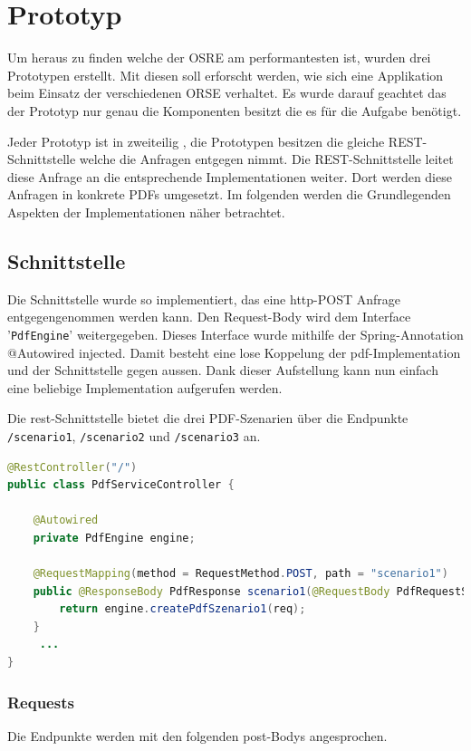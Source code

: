 \documentclass[main.tex]{subfiles}
\begin{document}
\chapter{Prototyp}
Um heraus zu finden welche der OSRE am performantesten ist, wurden drei Prototypen erstellt. Mit diesen soll erforscht werden, wie sich eine Applikation beim Einsatz der verschiedenen ORSE verhaltet. Es wurde darauf geachtet das der Prototyp nur genau die Komponenten besitzt die es für die Aufgabe benötigt.  

Jeder Prototyp ist in zweiteilig , die Prototypen besitzen die gleiche REST-Schnittstelle welche die Anfragen entgegen nimmt. Die REST-Schnittstelle leitet diese Anfrage  an die entsprechende Implementationen weiter. Dort werden diese Anfragen in konkrete PDFs umgesetzt. Im folgenden werden die Grundlegenden Aspekten der Implementationen näher betrachtet. 


\section{Schnittstelle}


Die Schnittstelle wurde so implementiert, das eine \acrshort{http}-POST Anfrage entgegengenommen werden kann. Den Request-Body wird dem Interface '\texttt{PdfEngine}' weitergegeben. Dieses Interface wurde mithilfe der Spring-Annotation @Autowired injected. Damit besteht eine lose Koppelung der \acrshort{pdf}-Implementation und der Schnittstelle gegen aussen. Dank dieser Aufstellung kann nun einfach eine beliebige Implementation aufgerufen werden.

Die \acrshort{rest}-Schnittstelle bietet die drei PDF-Szenarien über die Endpunkte \texttt{/scenario1}, \texttt{/scenario2} und \texttt{/scenario3} an.   

\begin{lstlisting}[language=Java]
@RestController("/")
public class PdfServiceController {

	@Autowired
	private PdfEngine engine;

	@RequestMapping(method = RequestMethod.POST, path = "scenario1")
	public @ResponseBody PdfResponse scenario1(@RequestBody PdfRequestScenario1 req) {
		return engine.createPdfSzenario1(req);
	}
     ...
}
\end{lstlisting}

\subsection{Requests}
Die Endpunkte werden mit den folgenden \gls{post}-Bodys angesprochen. 
\end{document}
